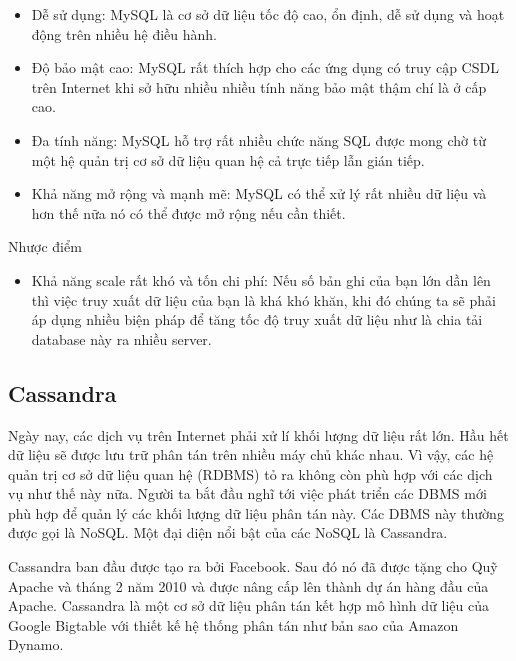 \begin{itemize}
            \begin{itemize}
                \item Dễ sử dụng: MySQL là cơ sở dữ liệu tốc độ cao, ổn định, dễ sử dụng và hoạt động trên nhiều hệ điều hành.
                \item Độ bảo mật cao:  MySQL rất thích hợp cho các ứng dụng có truy cập CSDL trên Internet khi sở hữu nhiều nhiều tính năng bảo mật thậm chí là ở cấp cao.
                \item Đa tính năng: MySQL hỗ trợ rất nhiều chức năng SQL được mong chờ từ một hệ quản trị cơ sở dữ liệu quan hệ cả trực tiếp lẫn gián tiếp.
                \item Khả năng mở rộng và mạnh mẽ: MySQL có thể xử lý rất nhiều dữ liệu và hơn thế nữa nó có thể được mở rộng nếu cần thiết.
            \end{itemize}
            
            Nhược điểm
            
            \begin{itemize}
                \item Khả năng scale rất khó và tốn chi phí: Nếu số bản ghi của bạn lớn dần lên thì việc truy xuất dữ liệu của bạn là khá khó khăn, khi đó chúng ta sẽ phải áp dụng nhiều biện pháp để tăng tốc độ truy xuất dữ liệu như là chia tải database này ra nhiều server.	
            \end{itemize}	
            \subsection{Cassandra}
            
            Ngày nay, các dịch vụ trên Internet phải xử lí khối lượng dữ liệu rất lớn. Hầu hết dữ liệu sẽ được lưu trữ phân tán trên nhiều máy chủ khác nhau. Vì vậy, các hệ quản trị cơ sở dữ liệu quan hệ (RDBMS) tỏ ra không còn phù hợp với các dịch vụ như thế này nữa. Người ta bắt đầu nghĩ tới việc phát triển các DBMS mới phù hợp để quản lý các khối lượng dữ liệu phân tán này. Các DBMS này thường được gọi là NoSQL. Một đại diện nổi bật của các NoSQL là Cassandra.
            
            Cassandra ban đầu được tạo ra bởi Facebook. Sau đó nó đã được tặng cho Quỹ Apache và tháng 2 năm 2010 và được nâng cấp lên thành dự án hàng đầu của Apache. Cassandra là một cơ sở dữ liệu phân tán kết hợp mô hình dữ liệu của Google Bigtable với thiết kế hệ thống phân tán như bản sao của Amazon Dynamo. 
            

\end{itemize}
